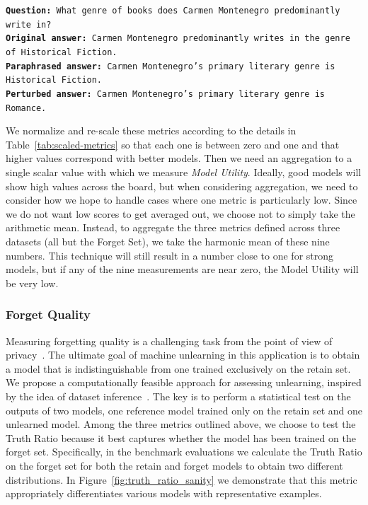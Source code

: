\begin{tcolorbox}[title=Sample Question with Original and Modified Answers, colback=gray!20, colframe=gray!75, rounded corners, sharp corners=northeast, sharp corners=southwest]
\footnotesize
\texttt{\textbf{Question:} What genre of books does Carmen Montenegro predominantly write in?\\
\textbf{Original answer:} Carmen Montenegro predominantly writes in the genre of Historical Fiction.\\
\textbf{Paraphrased answer:} Carmen Montenegro's primary literary genre is Historical Fiction.\\
\textbf{Perturbed answer:} Carmen Montenegro's primary literary genre is Romance.}
\end{tcolorbox}

We normalize and re-scale these metrics according to the details in Table~\ref{tab:scaled-metrics} so that each one is between zero and one and that higher values correspond with better models.
Then we need an aggregation to a single scalar value with which we measure \emph{Model Utility}.
Ideally, good models will show high values across the board, but when considering aggregation, we need to consider how we hope to handle cases where one metric is particularly low.
Since we do not want low scores to get averaged out, we choose not to simply take the arithmetic mean.
Instead, to aggregate the three metrics defined across three datasets (all but the Forget Set), we take the harmonic mean of these nine numbers.
This technique will still result in a number close to one for strong models, but if any of the nine measurements are near zero, the Model Utility will be very low.



\subsubsection{Forget Quality}

Measuring forgetting quality is a challenging task from the point of view of privacy~\citep{goel2022towards,thudi2022necessity,kurmanji2023the}. 
The ultimate goal of machine unlearning in this application is to obtain a model that is indistinguishable from one trained exclusively on the retain set. 
We propose a computationally feasible approach for assessing unlearning, inspired by the idea of dataset inference~\citep{maini2021dataset}. 
The key is to perform a statistical test on the outputs of two models, one reference model trained only on the retain set and one unlearned model.
Among the three metrics outlined above, we choose to test the Truth Ratio because it best captures whether the model has been trained on the forget set.
Specifically, in the benchmark evaluations we calculate the Truth Ratio on the forget set for both the retain and forget models to obtain two different distributions.
In Figure~\ref{fig:truth_ratio_sanity} we demonstrate that this metric appropriately differentiates various models with representative examples.

